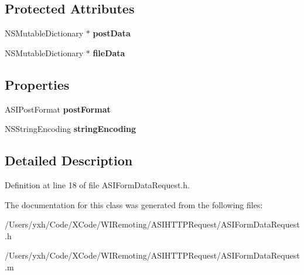 \subsection*{Protected Attributes}
\begin{DoxyCompactItemize}
\item 
\hypertarget{interface_a_s_i_form_data_request_a79f4daafa8563e0bfe7a20ea868f4c30}{
NSMutableDictionary $\ast$ {\bfseries postData}}
\label{interface_a_s_i_form_data_request_a79f4daafa8563e0bfe7a20ea868f4c30}

\item 
\hypertarget{interface_a_s_i_form_data_request_acdb6fbbceb1c18a5767f4946aca12230}{
NSMutableDictionary $\ast$ {\bfseries fileData}}
\label{interface_a_s_i_form_data_request_acdb6fbbceb1c18a5767f4946aca12230}

\end{DoxyCompactItemize}
\subsection*{Properties}
\begin{DoxyCompactItemize}
\item 
\hypertarget{interface_a_s_i_form_data_request_a0ad5abeee9bb810f180a960c1ac10ae2}{
ASIPostFormat {\bfseries postFormat}}
\label{interface_a_s_i_form_data_request_a0ad5abeee9bb810f180a960c1ac10ae2}

\item 
\hypertarget{interface_a_s_i_form_data_request_a67255c2a30ba48a62383a41648eb5bd2}{
NSStringEncoding {\bfseries stringEncoding}}
\label{interface_a_s_i_form_data_request_a67255c2a30ba48a62383a41648eb5bd2}

\end{DoxyCompactItemize}


\subsection{Detailed Description}


Definition at line 18 of file ASIFormDataRequest.h.

The documentation for this class was generated from the following files:\begin{DoxyCompactItemize}
\item 
/Users/yxh/Code/XCode/WIRemoting/ASIHTTPRequest/ASIFormDataRequest.h\item 
/Users/yxh/Code/XCode/WIRemoting/ASIHTTPRequest/ASIFormDataRequest.m\end{DoxyCompactItemize}
